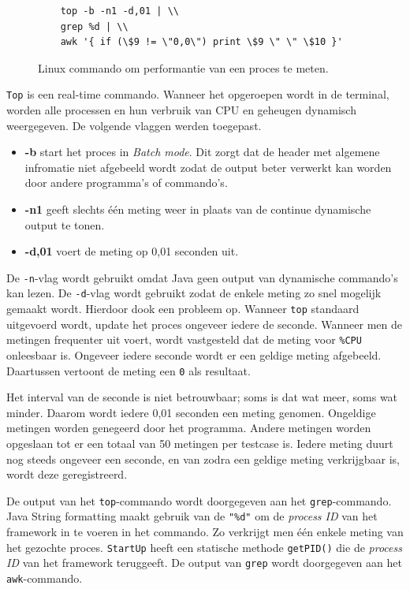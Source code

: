 \begin{figure}
\centering
\begin{verbatim}
	top -b -n1 -d,01 | \\
	grep %d | \\
	awk '{ if (\$9 != \"0,0\") print \$9 \" \" \$10 }'
\end{verbatim}
\caption{Linux commando om performantie van een proces te meten.}
\label{command}
\end{figure}

\verb+Top+ is een real-time commando. Wanneer het opgeroepen wordt in de terminal, worden alle processen en hun verbruik van CPU en geheugen dynamisch weergegeven. \autocite{topcommand} De volgende vlaggen werden toegepast.

\begin{itemize}
	\item \textbf{-b} start het proces in \textit{Batch mode}. Dit zorgt dat de header met algemene infromatie niet afgebeeld wordt zodat de output beter verwerkt kan worden door andere programma's of commando's.
	\item \textbf{-n1} geeft slechts één meting weer in plaats van de continue dynamische output te tonen.
	\item \textbf{-d,01} voert de meting op 0,01 seconden uit.
\end{itemize}

De \verb+-n+-vlag wordt gebruikt omdat Java geen output van dynamische commando's kan lezen. De \verb+-d+-vlag wordt gebruikt zodat de enkele meting zo snel mogelijk gemaakt wordt. Hierdoor dook een probleem op. Wanneer \verb+top+ standaard uitgevoerd wordt, update het proces ongeveer iedere de seconde. Wanneer men de metingen frequenter uit voert, wordt vastgesteld dat de meting voor \verb+%CPU+ onleesbaar is. Ongeveer iedere seconde wordt er een geldige meting afgebeeld. Daartussen vertoont de meting een \verb+0+ als resultaat.

Het interval van de seconde is niet betrouwbaar; soms is dat wat meer, soms wat minder. Daarom wordt iedere 0,01 seconden een meting genomen. Ongeldige metingen worden genegeerd door het programma. Andere metingen worden opgeslaan tot er een totaal van 50 metingen per testcase is. Iedere meting duurt nog steeds ongeveer een seconde, en van zodra een geldige meting verkrijgbaar is, wordt deze geregistreerd. 

De output van het \verb+top+-commando wordt doorgegeven aan het \verb+grep+-commando. Java String formatting maakt gebruik van de \verb|"%d"| om de \textit{process ID} van het framework in te voeren in het commando. Zo verkrijgt men één enkele meting van het gezochte proces. \verb+StartUp+ heeft een statische methode \verb+getPID()+ die de \textit{process ID} van het framework teruggeeft. De output van \verb+grep+ wordt doorgegeven aan het \verb+awk+-commando.

